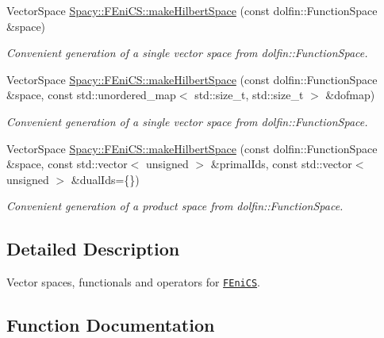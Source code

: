 \begin{DoxyCompactItemize}
Vector\+Space \hyperlink{group__FenicsGroup_ga89defe8c7e08ab224af2a3cd0445e254_ga89defe8c7e08ab224af2a3cd0445e254}{Spacy\+::\+F\+Eni\+C\+S\+::make\+Hilbert\+Space} (const dolfin\+::\+Function\+Space \&space)
\begin{DoxyCompactList}\small\item\em Convenient generation of a single vector space from dolfin\+::\+Function\+Space. \end{DoxyCompactList}\item 
Vector\+Space \hyperlink{group__FenicsGroup_ga1aaf48bfbd005bee810090a01404ab4a_ga1aaf48bfbd005bee810090a01404ab4a}{Spacy\+::\+F\+Eni\+C\+S\+::make\+Hilbert\+Space} (const dolfin\+::\+Function\+Space \&space, const std\+::unordered\+\_\+map$<$ std\+::size\+\_\+t, std\+::size\+\_\+t $>$ \&dofmap)
\begin{DoxyCompactList}\small\item\em Convenient generation of a single vector space from dolfin\+::\+Function\+Space. \end{DoxyCompactList}\item 
Vector\+Space \hyperlink{group__FenicsGroup_gaa16b365c49ec0660e5f707ad7da38a75_gaa16b365c49ec0660e5f707ad7da38a75}{Spacy\+::\+F\+Eni\+C\+S\+::make\+Hilbert\+Space} (const dolfin\+::\+Function\+Space \&space, const std\+::vector$<$ unsigned $>$ \&primal\+Ids, const std\+::vector$<$ unsigned $>$ \&dual\+Ids=\{\})
\begin{DoxyCompactList}\small\item\em Convenient generation of a product space from dolfin\+::\+Function\+Space. \end{DoxyCompactList}\end{DoxyCompactItemize}


\subsection{Detailed Description}
Vector spaces, functionals and operators for \href{http://www.fenicsproject.org}{\tt F\+Eni\+C\+S}. 



\subsection{Function Documentation}
\hypertarget{group__FenicsGroup_ga7f43f0c660d0646adb031b453c536bb0_ga7f43f0c660d0646adb031b453c536bb0}{}
